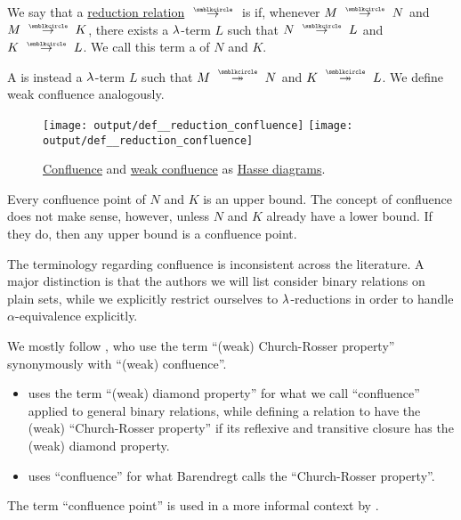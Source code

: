 \begin{definition}\label{def:reduction_confluence}
  We say that a \hyperref[def:lambda_reduction]{reduction relation} \( {\pred} \) is  if, whenever \( M \pred N \) and \( M \pred K \), there exists a \( \mathrm{\lambda} \)-term \( L \) such that \( N \pred L \) and \( K \pred L \). We call this term a   of \( N \) and \( K \).

  A  is instead a \( \mathrm{\lambda} \)-term \( L \) such that \( M \pred* N \) and \( K \pred* L \). We define weak confluence analogously.

  \begin{figure}[!ht]
    \hfill
    \hfill
    \texttt{[image: output/def\_\_reduction\_confluence]}
    \hfill
    \texttt{[image: output/def\_\_reduction\_confluence]}
    \hfill
    \caption{\hyperref[def:reduction_confluence]{Confluence} and \hyperref[def:reduction_confluence]{weak confluence} as \hyperref[def:hasse_diagram]{Hasse diagrams}.}\label{fig:def:relation_confluence}
  \end{figure}
\end{definition}
\begin{comments}
  \item Every confluence point of \( N \) and \( K \) is an upper bound. The concept of confluence does not make sense, however, unless \( N \) and \( K \) already have a lower bound. If they do, then any upper bound is a confluence point.

  \item The terminology regarding confluence is inconsistent across the literature. A major distinction is that the authors we will list consider binary relations on plain sets, while we explicitly restrict ourselves to \( \mathrm{\lambda} \)-reductions in order to handle \( \alpha \)-equivalence explicitly.

  We mostly follow , who use the term \enquote{(weak) Church-Rosser property} synonymously with \enquote{(weak) confluence}.
  \begin{itemize}
    \item {} uses the term \enquote{(weak) diamond property} for what we call \enquote{confluence} applied to general binary relations, while defining a relation to have the (weak) \enquote{Church-Rosser property} if its reflexive and transitive closure has the (weak) diamond property.

    \item {} uses \enquote{confluence} for what Barendregt calls the \enquote{Church-Rosser property}.
  \end{itemize}

  The term \enquote{confluence point} is used in a more informal context by .
\end{comments}

